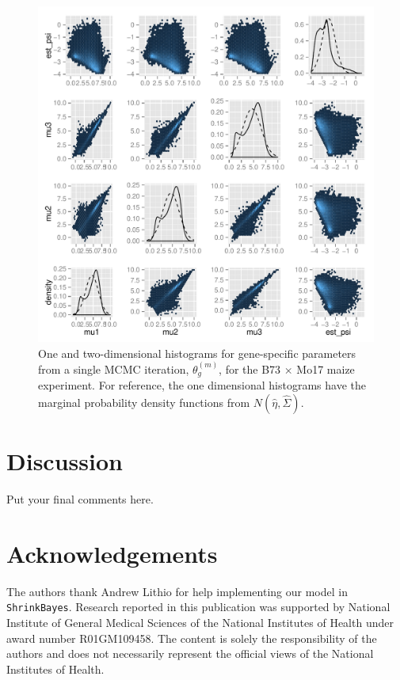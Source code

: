 \documentclass[useAMS,usenatbib,referee]{biom}
\begin{document}
\begin{figure}
\centerline{\includegraphics[width=\textwidth]{normality}}
\caption{One and two-dimensional histograms for gene-specific parameters from a single MCMC iteration, $\theta_g^{(m)}$,  for the B73 $\times$ Mo17 maize experiment. For reference, the one dimensional histograms have the marginal probability density functions from $N(\hat{\eta},\hat{\Sigma})$.}
\label{f:normality}
\end{figure}



\section{Discussion}
\label{s:discuss}

Put your final comments here. 



\backmatter %



\section*{Acknowledgements}

The authors thank Andrew Lithio for help implementing our model in {\tt ShrinkBayes}. Research reported in this publication was supported by National Institute of General Medical Sciences of the National Institutes of Health under award number R01GM109458. The content is solely the responsibility of the authors and does not necessarily represent the official views of the National Institutes of Health.
\end{document}
